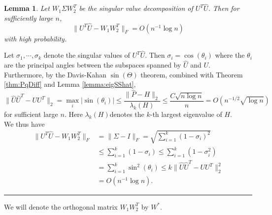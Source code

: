 \documentclass[a4paper]{article}
\newenvironment{proof}{{\bf Proof:  }}{\hfill\rule{2mm}{2mm}}
\newtheorem{lemma}[fact]{Lemma}
\begin{document}
\begin{lemma}
\label{lemma:AlmostOrthogonal}
Let $W_1 \Sigma W_2^T$ be the singular value decomposition of $U^T \hat{U}$. Then for sufficiently large $n$, 
\[
	\| U^T \hat{U} - W_1 W_2^T \|_F = O(n^{-1} \log n)
\]
with high probability.
\end{lemma}
\begin{proof}
Let $\sigma_1, \cdots, \sigma_k$ denote the singular values of $U^T \hat{U}$. Then $\sigma_i = \cos(\theta_i)$ where the $\theta_i$ are the principal angles between the subspaces spanned by $\hat{U}$ and $U$. Furthermore, by the Davis-Kahan $\sin(\Theta)$ theorem, combined with Theorem \ref{thm:PqDiff} and Lemma \ref{lemma:eigSShat},
\begin{equation}
\label{eqn:uhat2u2diff}
	\|\hat{U} \hat{U}^T - U U^T\|_2 = \max_i |\sin(\theta_i)|
    \le \frac{\|\hat{P} - H\|_2}{\lambda_k(H)}
    \le \frac{C \sqrt{n \log n}}{n} = O(n^{-1/2} \sqrt{\log n})
\end{equation}
for sufficient large $n$. Here $\lambda_k(H)$denotes the $k$-th largest eigenvalue of $H$.\\
We thus have
\begin{align*}
	\| U^T \hat{U} - W_1 W_2^T \|_F
    & = \| \Sigma - I \|_F
    = \sqrt{\sum_{i=1}^k (1-\sigma_i)^2} \\
    & \le \sum_{i=1}^k (1-\sigma_i) \le \sum_{i=1}^k (1-\sigma_i^2) \\
    & = \sum_{i=1}^k \sin^2(\theta_i)
    \le k \|\hat{U} \hat{U}^T - U U^T\|_2^2 \\
    & = O(n^{-1} \log n).
\end{align*}
\end{proof}

We will denote the orthogonal matrix $W_1 W_2^T$ by $W^*$.
\end{document}
